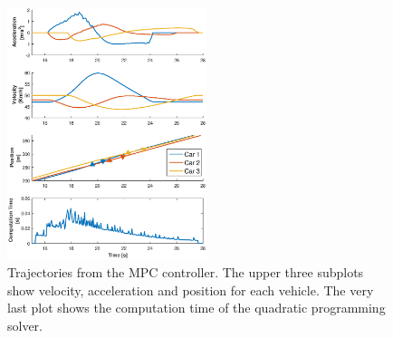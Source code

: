 \documentclass[letterpaper,10pt,conference]{ieeeconf}
\begin{document}
\begin{figure}[h!]
    \centering
    \includegraphics[width=0.52\textwidth]{New_Result_ds4.eps}
    \caption{Trajectories from the MPC controller. The upper three subplots show velocity, acceleration and position for each vehicle. The very last plot shows the computation time of the quadratic programming solver.}
    \label{fig:sim_results}
\end{figure}
\end{document}
